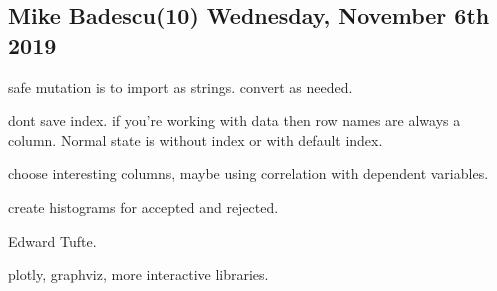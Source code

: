 \subsection{Mike Badescu(10) Wednesday, November 6th 2019}

safe mutation is to import as strings.
convert as needed. 

dont save index. if you're working
with data then row names are always a column.
Normal state is without index or with default index.

choose interesting columns, maybe using
correlation with dependent variables.

create histograms for accepted and rejected.

Edward Tufte.

plotly, graphviz, more interactive libraries. 